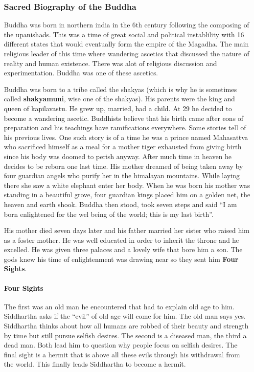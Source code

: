 \documentclass{article}
\begin{document}
\subsubsection*{Sacred Biography of the Buddha}
\label{ssub:sacred_biography_of_the_buddha}
Buddha was born in northern india in the 6th century following the composing of the upanishads. This was a time of great social and political instablility with 16 different states that would eventually form the empire of the Magadha. The main religious leader of this time where wandering ascetics that discussed the nature of reality and human existence. There was alot of religious discussion and experimentation. Buddha was one of these ascetics.

Buddha was born to a tribe called the shakyas (which is why he is sometimes called \textbf{shakyamuni}, wise one of the shakyas). His parents were the king and queen of kapilavastu. He grew up, married, had a child. At 29 he decided to become a wandering ascetic. Buddhists believe that his birth came after eons of preparation and his teachings have ramifications everywhere. Some stories tell of his previous lives. One such story is of a time he was a prince named Mahasattva who sacrificed himself as a meal for a mother tiger exhausted from giving birth since his body was doomed to perish anyway. After much time in heaven he decides to be reborn one last time. His mother dreamed of being taken away by four guardian angels who purify her in the himalayan mountains. While laying there she saw a white elephant enter her body. When he was born his mother was standing in a beautiful grove, four guardian kings placed him on a golden net, the heaven and earth shook. Buddha then stood, took seven steps and said ``I am born enlightened for the wel being of the world; this is my last birth''.

His mother died seven days later and his father married her sister who raised him as a foster mother. He was well educated in order to inherit the throne and he excelled. He was given three palaces and a lovely wife that bore him a son. The gods knew his time of enlightenment was drawing near so they sent him \textbf{Four Sights}.

\paragraph{Four Sights}
The first was an old man he encountered that had to explain old age to him. Siddhartha asks if the ``evil'' of old age will come for him. The old man says yes. Siddhartha thinks about how all humans are robbed of their beauty and strength by time but still pursue selfish desires. The second is a diseased man, the third a dead man. Both lead him to question why people focus on selfish desires. The final sight is a hermit that is above all these evils through his withdrawal from the world. This finally leads Siddhartha to become a hermit.
\end{document}

